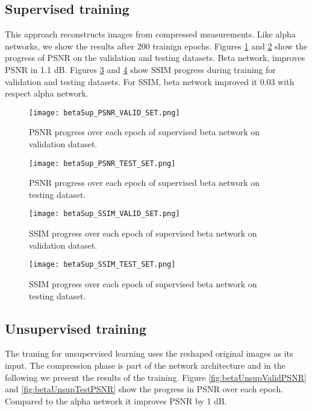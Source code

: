\subsection{Supervised training}
This approach reconstructs images from compressed measurements. Like alpha networks, we show the results after 200 trainign epochs. Figures \ref{fig:betaSupValidPSNR} and \ref{fig:betaSupTestPSNR} show the progress of PSNR on the validation and testing datasets. Beta network, improves PSNR in 1.1 dB. Figures \ref{fig:betaSupValidSSIM} and \ref{fig:betaSupTestSSIM} show SSIM progress during training for validation and testing datasets. For SSIM, beta network improved it 0.03 with respect alpha network.  
\begin{figure}[!htb]
\centering 
\texttt{[image: betaSup\_PSNR\_VALID\_SET.png]} 
\caption[PSNR validation progress during training of supervised beta network]{PSNR progress over each epoch of supervised beta network on validation dataset.}
\label{fig:betaSupValidPSNR} 
\end{figure}  

\begin{figure}[!htb]
\centering 
\texttt{[image: betaSup\_PSNR\_TEST\_SET.png]} 
\caption[PSNR testing progress during training of supervised beta network]{PSNR progress over each epoch of supervised beta network on testing dataset.}
\label{fig:betaSupTestPSNR} 
\end{figure}  

\begin{figure}[!htb]
\centering 
\texttt{[image: betaSup\_SSIM\_VALID\_SET.png]} 
\caption[SSIM validation progress during training of supervised beta network]{SSIM progress over each epoch of supervised beta network on validation dataset.}
\label{fig:betaSupValidSSIM} 
\end{figure}  

\begin{figure}[!htb] 
\centering 
\texttt{[image: betaSup\_SSIM\_TEST\_SET.png]} 
\caption[SSIM testing progress during training of supervised beta network]{SSIM progress over each epoch of supervised beta network on testing dataset.}
\label{fig:betaSupTestSSIM} 
\end{figure}  

\FloatBarrier

\subsection{Unsupervised training}
The traning for unsupervised learning uses the reshaped original images as its input. The compression phase is part of the network architecture and in the following we present the results of the training. Figure \ref{fig:betaUnsupValidPSNR} and \ref{fig:betaUnsupTestPSNR} show the progress in PSNR over each epoch. Compared to the alpha network it improves PSNR by 1 dB.     

